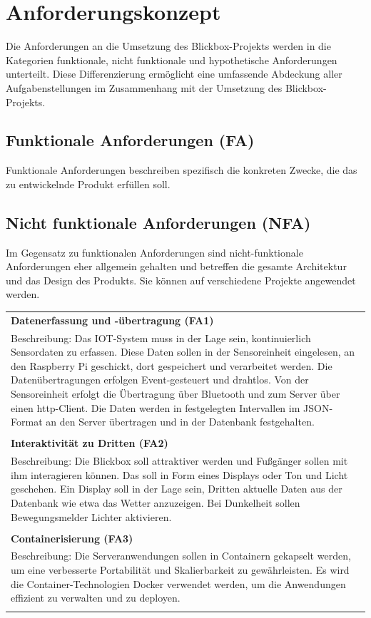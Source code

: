 \documentclass[
]{article}
\begin{document}
\section{Anforderungskonzept}
Die Anforderungen an die Umsetzung des Blickbox-Projekts werden in die Kategorien funktionale, nicht funktionale und hypothetische Anforderungen unterteilt.
Diese Differenzierung ermöglicht eine umfassende Abdeckung aller Aufgabenstellungen im
Zusammenhang mit der Umsetzung des Blickbox-Projekts.

\subsection{Funktionale Anforderungen (FA)}
  Funktionale Anforderungen beschreiben spezifisch die konkreten Zwecke, die das zu entwickelnde Produkt erfüllen soll.

\subsection{Nicht funktionale Anforderungen (NFA)}
Im Gegensatz zu funktionalen Anforderungen sind nicht-funktionale Anforderungen eher allgemein gehalten und betreffen die gesamte Architektur und das Design des Produkts.
Sie können auf verschiedene Projekte angewendet werden.

\begin{center}
  \begin{tabular}{|p{\linewidth}|}
    \hline
    \textbf{Datenerfassung und -übertragung (FA1)} \\
    Beschreibung: Das IOT-System muss in der Lage sein, kontinuierlich Sensordaten zu erfassen.
    Diese Daten sollen in der Sensoreinheit eingelesen, an den Raspberry Pi geschickt, dort gespeichert und verarbeitet werden.
    Die Datenübertragungen erfolgen Event-gesteuert und drahtlos.
    Von der Sensoreinheit erfolgt die Übertragung über Bluetooth und zum Server über einen http-Client.
    Die Daten werden in festgelegten Intervallen im JSON-Format an den Server übertragen und in der Datenbank festgehalten. \\ \\
    \hline
    \textbf{Interaktivität zu Dritten (FA2)} \\
    Beschreibung: Die Blickbox soll attraktiver werden und Fußgänger sollen mit ihm interagieren können.
    Das soll in Form eines Displays oder Ton und Licht geschehen.
    Ein Display soll in der Lage sein, Dritten aktuelle Daten aus der Datenbank wie etwa das Wetter anzuzeigen.
    Bei Dunkelheit sollen Bewegungsmelder Lichter aktivieren.\\ \\
    \hline
    \textbf{Containerisierung (FA3)} \\
    Beschreibung: Die Serveranwendungen sollen in Containern gekapselt werden, um eine verbesserte Portabilität und Skalierbarkeit zu gewährleisten.
    Es wird die Container-Technologien Docker verwendet werden, um die Anwendungen effizient zu verwalten und zu deployen. \\ \\
    \hline
  \end{tabular}
\end{center}
\end{document}
